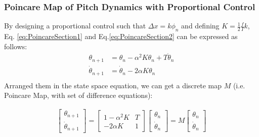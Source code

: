\subsubsection{Poincare Map of Pitch Dynamics with Proportional Control}
By designing a proportional control such that $\Delta x = k\phi_n$ and defining $K =\frac{1}{2} \frac{f}{I}k$, Eq. \ref{eq:PoincareSection1} and Eq.\ref{eq:PoincareSection2} can be expressed as follows:
\begin{align*}
\theta_{n+1} &= \theta_n  - \alpha^2 K \theta_n + T\dot \theta_n\\
\dot \theta_{n+1} &= \dot \theta_n  - 2\alpha K \theta_n\\
\end{align*}
Arranged them in the state space equation, we can get a discrete map $M$ (i.e. Poincare Map, with set of difference equations):

\begin{align}
\label{eq:PoincareMap}
\begin{bmatrix}
\theta_{n+1}  \\
\dot \theta_{n+1}
\end{bmatrix} = \begin{bmatrix}
1-\alpha^2 K & T \\
-2\alpha K & 1
\end{bmatrix}\begin{bmatrix}
 \theta_n  \\
\dot \theta_n 
\end{bmatrix} = M
\begin{bmatrix}
 \theta_n  \\
\dot \theta_n 
\end{bmatrix}
\end{align}


